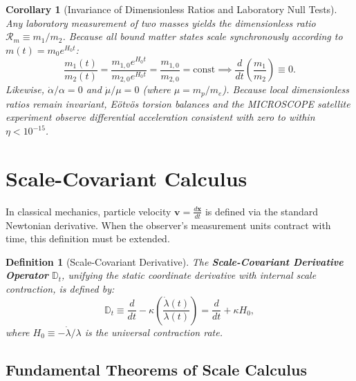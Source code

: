 \documentclass[11pt,a4paper]{article}
\newtheorem{definition}{Definition}[section]
\newtheorem{corollary}{Corollary}[theorem]
\begin{document}
\begin{corollary}[Invariance of Dimensionless Ratios and Laboratory Null Tests]
    \label{cor:boyutsuz_oranlar_sc}
    Any laboratory measurement of two masses yields the dimensionless ratio $\mathcal{R}_m \equiv m_1 / m_2$. Because all bound matter states scale synchronously according to $m(t) = m_0 e^{H_0 t}$:
    \begin{equation}
        \frac{m_1(t)}{m_2(t)} = \frac{m_{1,0} e^{H_0 t}}{m_{2,0} e^{H_0 t}} = \frac{m_{1,0}}{m_{2,0}} = \text{const} \implies \frac{d}{dt}\left(\frac{m_1}{m_2}\right) \equiv 0.
        \label{eq:boyutsuz_oran_sc}
    \end{equation}
    Likewise, $\dot{\alpha}/\alpha = 0$ and $\dot{\mu}/\mu = 0$ (where $\mu = m_p/m_e$). Because local dimensionless ratios remain invariant, Eötvös torsion balances and the MICROSCOPE satellite experiment observe differential acceleration consistent with zero to within $\eta < 10^{-15}$.
\end{corollary}

\section{Scale-Covariant Calculus}
\label{sec:kalkulus}

In classical mechanics, particle velocity $\mathbf{v} = \frac{d\mathbf{x}}{dt}$ is defined via the standard Newtonian derivative. When the observer's measurement units contract with time, this definition must be extended.

\begin{definition}[Scale-Covariant Derivative]
    \label{def:olcek_kovaryant_turev_sc}
    The \textbf{Scale-Covariant Derivative Operator} $\mathbb{D}_t$, unifying the static coordinate derivative with internal scale contraction, is defined by:
    \begin{equation}
        \mathbb{D}_t \equiv \frac{d}{dt} - \kappa \left( \frac{\dot{\lambda}(t)}{\lambda(t)} \right) = \frac{d}{dt} + \kappa H_0,
        \label{eq:olcek_turev_operatoru}
    \end{equation}
    where $H_0 \equiv -\dot{\lambda}/\lambda$ is the universal contraction rate.
\end{definition}

\subsection{Fundamental Theorems of Scale Calculus}
\end{document}

